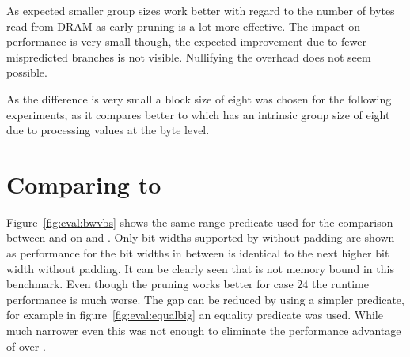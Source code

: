 As expected smaller group sizes work better with regard to the number of bytes
read from DRAM as early pruning is a lot more effective. The impact on
performance is very small though, the expected improvement due to fewer
mispredicted branches is not visible. Nullifying the overhead does not seem
possible.

As the difference is very small a block size of eight was chosen for the
following experiments, as it compares better to \bs{} which has an intrinsic
group size of eight due to processing values at the byte level.

\section{Comparing \bwv{} to \bs{}}

Figure~\ref{fig:eval:bwvbs} shows the same range predicate used for the
comparison between \simdscan{} and \bwv{} on \bs{} and \bwv{}. Only bit widths
supported by \bs{} without padding are shown as \bs{} performance for the bit
widths in between is identical to the next higher bit width without padding. It
can be clearly seen that \bs{} is not memory bound in this benchmark. Even
though the pruning works better for case $24$ the runtime performance is much
worse. The gap can be reduced by using a simpler predicate, for example in
figure~\ref{fig:eval:equalbig} an equality predicate was used. While much
narrower even this was not enough to eliminate the performance advantage of
\bwv{} over \bs{}.

